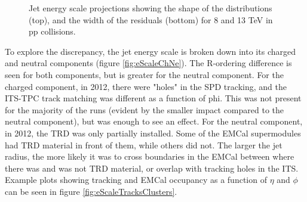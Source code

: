 \documentclass[ALICE]{ALICE_analysis_notes}
\newcommand{\pp}{pp\xspace}
\begin{document}
\begin{figure}[h!]
    \centering
    \caption{Jet energy scale projections showing the shape of the distributions (top), and the width of the residuals (bottom) for 8 and 13 TeV in \pp collisions.}
    \label{fig:eScaleShapeWidth}
\end{figure}

To explore the discrepancy, the jet energy scale is broken down into its charged and neutral components (figure \ref{fig:eScaleChNe}). The R-ordering difference is seen for both components, but is greater for the neutral component. For the charged component, in 2012, there were "holes" in the SPD tracking, and the ITS-TPC track matching was different as a function of phi. This was not present for the majority of the runs (evident by the smaller impact compared to the neutral component), but was enough to see an effect. For the neutral component, in 2012, the TRD was only partially installed. Some of the EMCal supermodules had TRD material in front of them, while others did not. The larger the jet radius, the more likely it was to cross boundaries in the EMCal between where there was and was not TRD material, or overlap with tracking holes in the ITS. Example plots showing tracking and EMCal occupancy as a function of $\eta$ and $\phi$ can be seen in figure \ref{fig:eScaleTracksClusters}.
\end{document}
